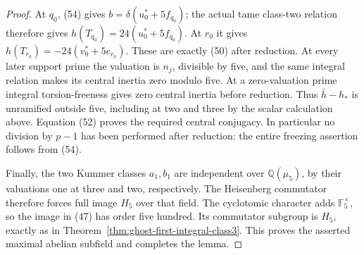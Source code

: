 \begin{proof}
At \(q_0\), (54) gives
\(b=\delta(u_0^*+5f_{q_0})\); the actual tame
class-two relation therefore gives
\(h(T_{q_0})=24(u_0^*+5f_{q_0})\).
At \(r_0\) it gives
\(h(T_{r_0})=-24(v_0^*+5e_{r_0})\).
These are exactly (50) after reduction.
At every later support prime the valuation is
\(n_j\), divisible by five, and the same integral
relation makes its central inertia zero modulo five.
At a zero-valuation prime integral torsion-freeness
gives zero central inertia before reduction.
Thus \(\bar h-h_*\) is unramified outside five,
including at two and three by the scalar calculation
above. Equation (52) proves the required central
conjugacy. In particular no division by \(p-1\)
has been performed after reduction: the entire
freezing assertion follows from (54).

Finally, the two Kummer classes \(a_1,b_1\) are
independent over \(\mathbb Q(\mu_5)\), by their
valuations one at three and two, respectively.
The Heisenberg commutator therefore forces full
image \(H_5\) over that field. The cyclotomic
character adds \(\mathbb F_5^\times\), so the
image in (47) has order five hundred. Its commutator
subgroup is \(H_5\), exactly as in
Theorem~\ref{thm:ghost-first-integral-class3}.
This proves the asserted maximal abelian subfield
and completes the lemma.
\end{proof}


